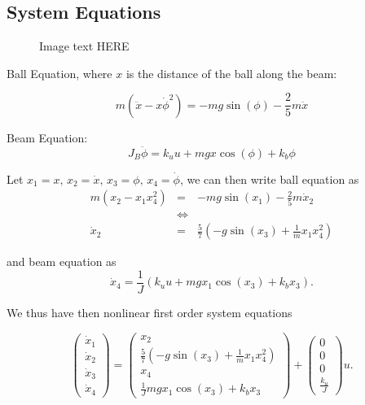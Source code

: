 \subsection{System Equations}

\begin{figure}[\textwidth]
\centering

\caption{Image text HERE}
\label{fig:throw}
\end{figure}


Ball Equation, where $x$ is the distance of the ball along the beam:

\begin{equation}
m(\ddot{x}-x\dot{\phi}^{2})=-mg\sin(\phi)-\frac{2}{5}m\ddot{x}
\end{equation}


Beam Equation:
\begin{equation}
J_{B}\ddot{\phi}=k_{u}u+mgx\cos(\phi)+k_b\phi
\end{equation}


Let $x_{1}=x,\, x_{2}=\dot{x},\, x_{3}=\phi,\, x_{4}=\dot{\phi}$,
we can then write ball equation as 
\begin{eqnarray*}
m(x_{2}-x_{1}x_{4}^{2}) & = & -mg\sin(x_{1})-\frac{2}{5}m\dot{x}_{2}\\
 & \Leftrightarrow\\
\dot{x}_{2} & = & \frac{5}{7}\left(-g\sin(x_{3})+\frac{1}{m}x_{1}x_{4}^{2}\right)
\end{eqnarray*}


and beam equation as
\[
\dot{x}_{4}=\frac{1}{J}\left(k_{u}u+mgx_{1}\cos(x_3)+k_bx_3\right).
\]


We thus have then nonlinear first order system equations

\[
\begin{pmatrix}\dot{x}_{1}\\
\dot{x}_{2}\\
\dot{x}_{3}\\
\dot{x}_{4}
\end{pmatrix}=\begin{pmatrix}x_{2}\\
\frac{5}{7}\left(-g\sin(x_{3})+\frac{1}{m}x_{1}x_{4}^{2}\right)\\
x_{4}\\
\frac{1}{J}mgx_{1}\cos(x_3)+k_bx_3
\end{pmatrix}+\begin{pmatrix}0\\
0\\
0\\
\frac{k_{u}}{J}
\end{pmatrix}u.
\]



